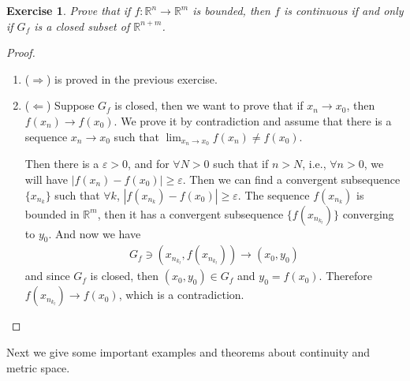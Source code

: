 \documentclass[12pt,leqno]{amsart}
\newtheorem{exercise}{Exercise}[section]
\theoremstyle{definition}
\numberwithin{equation}{subsection}
\begin{document}
\medskip

\newpage
\begin{exercise}
Prove that if $f:\mathbb{R}^n\to \mathbb{R}^m$ is bounded, then $f$ is continuous if and only if $G_f$ is a closed subset of $\mathbb{R}^{n+m}$.
\end{exercise}
\begin{proof}
~\begin{enumerate}
    \item ($\Rightarrow$) is proved in the previous exercise.
    \item ($\Leftarrow$) Suppose $G_f$ is closed, then we want to prove that if $x_n\to x_0$, then $f(x_n)\to f(x_0)$. We prove it by contradiction and assume that there is a sequence $x_n\to x_0$ such that $\lim_{x_n\to x_0}f(x_n)\neq f(x_0)$.
    
    Then there is a $\varepsilon > 0$, and for $\forall N > 0$ such that if $n > N$, i.e., $\forall n > 0$, we will have $|f(x_n) - f(x_0)|\geq \varepsilon$. Then we can find a convergent subsequence $\{x_{n_k}\}$ such that $\forall k$, $|f(x_{n_k}) - f(x_0)|\geq \varepsilon$. The sequence $f(x_{n_k})$ is bounded in $\mathbb{R}^m$, then it has a convergent subsequence $\{f(x_{n_{k_l}})\}$ converging to $y_0$. And now we have 
    \begin{align*}
        G_f \ni \left(x_{n_{k_l}},f(x_{n_{k_l}})\right) \to (x_0,y_0)
    \end{align*}
    and since $G_f$ is closed, then $(x_0,y_0)\in G_f$ and $y_0 = f(x_0)$. Therefore $f(x_{n_{k_l}})\to f(x_0)$, which is a contradiction.
\end{enumerate}
\end{proof}

\medskip
 
Next we give some important examples and theorems about continuity and metric space.
\end{document}
